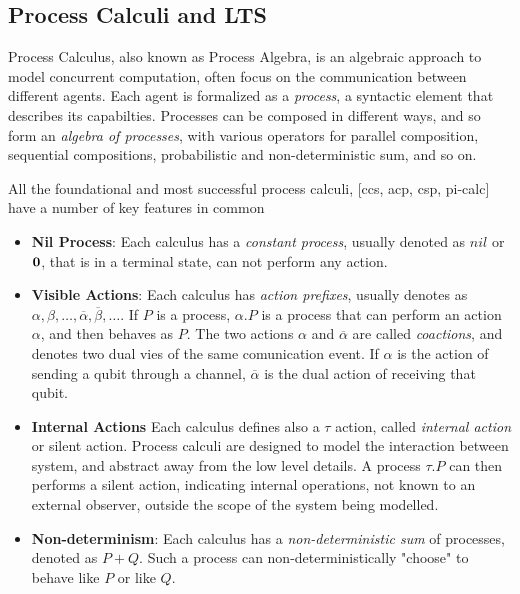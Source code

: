 \subsection{Process Calculi and LTS}


Process Calculus, also known as Process Algebra, is an algebraic approach to model concurrent computation, often focus on the communication between different agents. Each agent is formalized as a \textit{process}, a syntactic element that describes its capabilties. Processes can be composed in different ways, and so form an \textit{algebra of processes}, with various operators for parallel composition, sequential compositions, probabilistic and non-deterministic sum, and so on.

All the foundational and most successful process calculi, [ccs, acp, csp, pi-calc] have a number of key features in common \begin{itemize}
\item \textbf{Nil Process}: Each calculus has a \textit{constant process}, usually denoted as $nil$ or $\mathbf{0}$, that is in a terminal state, can not perform any action.
\item \textbf{Visible Actions}: Each calculus has \textit{action prefixes}, usually denotes as $\alpha, \beta, \ldots, \overline{\alpha}, \overline{\beta}, \ldots$. If $P$ is a process, $\alpha.P$ is a process that can perform an action $\alpha$, and then behaves as $P$. The two actions $\alpha$ and $\overline{\alpha}$ are called \textit{coactions}, and denotes two dual vies of the same comunication event. If $\alpha$ is the action of sending a qubit through a channel, $\overline{\alpha}$ is the dual action of receiving that qubit. 
\item \textbf{Internal Actions} Each calculus defines also a $\tau$ action, called \textit{internal action} or silent action. Process calculi are designed to model the interaction between system, and abstract away from the low level details. A process $\tau.P$ can then performs a silent action, indicating internal operations, not known to an external observer, outside the scope of the system being modelled. 
\item \textbf{Non-determinism}: Each calculus has a \textit{non-deterministic sum} of processes, denoted as $P + Q$. Such a process can non-deterministically "choose" to behave like $P$ or like $Q$. 

\end{itemize}
